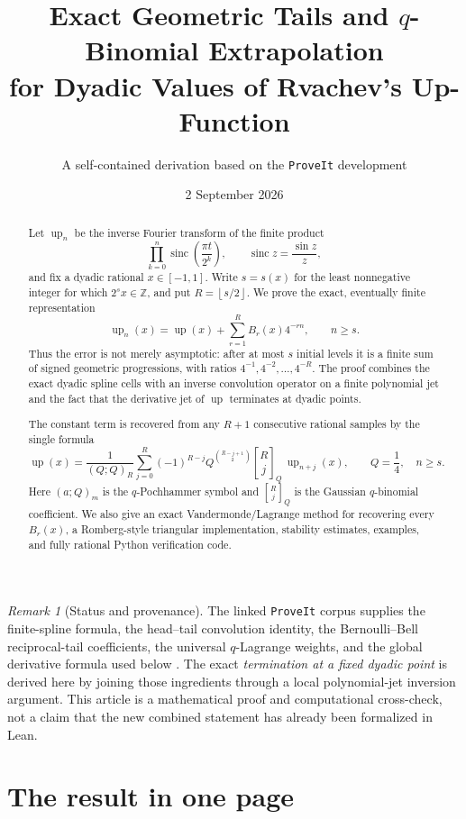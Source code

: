 \documentclass[11pt]{article}
\title{\bfseries Exact Geometric Tails and \(q\)-Binomial Extrapolation\\[0.25em]
for Dyadic Values of Rvachev's Up-Function}
\author{A self-contained derivation based on the \texttt{ProveIt} development}
\date{2 September 2026}
\theoremstyle{definition}
\theoremstyle{remark}
\newtheorem{remark}[remark]{Remark}
\newcommand{\Z}{\mathbb Z}
\newcommand{\sinc}{\operatorname{sinc}}
\newcommand{\rv}{\operatorname{up}}
\newcommand{\qbinom}[3]{\genfrac{[}{]}{0pt}{}{#1}{#2}_{#3}}
\newcommand{\floor}[1]{\left\lfloor #1\right\rfloor}
\begin{document}
\maketitle

\begin{abstract}
Let \(\rv_n\) be the inverse Fourier transform of the finite product
\[
  \prod_{k=0}^{n}\sinc\!\left(\frac{\pi t}{2^k}\right),
  \qquad \sinc z=\frac{\sin z}{z},
\]
and fix a dyadic rational \(x\in[-1,1]\).  Write \(s=s(x)\) for the least
nonnegative integer for which \(2^s x\in\Z\), and put
\(R=\floor{s/2}\).  We prove the exact, eventually finite representation
\[
 \rv_n(x)=\rv(x)+\sum_{r=1}^{R}B_r(x)4^{-rn},\qquad n\ge s.
\]
Thus the error is not merely asymptotic: after at most \(s\) initial levels it
is a finite sum of signed geometric progressions, with ratios
\(4^{-1},4^{-2},\ldots,4^{-R}\).  The proof combines the exact dyadic spline
cells with an inverse convolution operator on a finite polynomial jet and the
fact that the derivative jet of \(\rv\) terminates at dyadic points.

The constant term is recovered from any \(R+1\) consecutive rational samples
by the single formula
\[
 \boxed{
 \rv(x)=\frac{1}{(Q;Q)_R}
 \sum_{j=0}^{R}(-1)^{R-j}Q^{\binom{R-j+1}{2}}
 \qbinom{R}{j}{Q}\,\rv_{n+j}(x),
 \qquad Q=\frac14,\quad n\ge s.}
\]
Here \((a;Q)_m\) is the \(q\)-Pochhammer symbol and
\(\qbinom{R}{j}{Q}\) is the Gaussian \(q\)-binomial coefficient.  We also
give an exact Vandermonde/Lagrange method for recovering every \(B_r(x)\), a
Romberg-style triangular implementation, stability estimates, examples, and
fully rational Python verification code.
\end{abstract}

\begin{remark}[Status and provenance]
The linked \texttt{ProveIt} corpus supplies the finite-spline formula, the
head--tail convolution identity, the Bernoulli--Bell reciprocal-tail
coefficients, the universal \(q\)-Lagrange weights, and the global derivative
formula used below \cite{proveit-primary,proveit-frontiers}.  The exact
\emph{termination at a fixed dyadic point} is derived here by joining those
ingredients through a local polynomial-jet inversion argument.  This article
is a mathematical proof and computational cross-check, not a claim that the
new combined statement has already been formalized in Lean.
\end{remark}

\tableofcontents
\newpage

\section{The result in one page}
\end{document}
